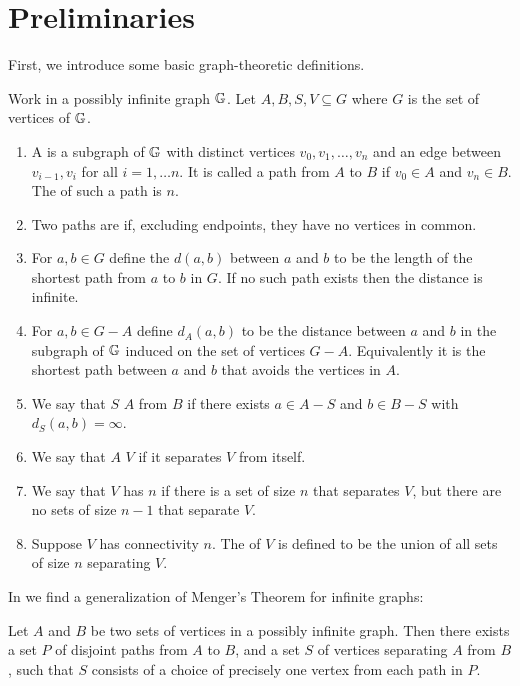 \section{Preliminaries}
First, we introduce some basic graph-theoretic definitions.
\begin{Definition}
  Work in a possibly infinite graph $\mathbb G$. Let $A, B, S, V \subseteq G$ where $G$ is the set of vertices of $\mathbb G$.
  \begin{enumerate}
  \item A  is a subgraph of $\mathbb G$ with distinct vertices $v_0, v_1, \ldots, v_n$ and an edge between $v_{i-1}, v_i$ for all $i = 1, \ldots n$.
    It is called a path from $A$ to $B$ if $v_0 \in A$ and $v_n \in B$.
    The  of such a path is $n$.
  \item Two paths are  if, excluding endpoints, they have no vertices in common.
  \item For $a,b \in G$ define the  $d(a,b)$ between $a$ and $b$ to be the length of the shortest path from $a$ to $b$ in $G$.
    If no such path exists then the distance is infinite.
  \item For $a,b \in G - A$ define $d_A(a,b)$ to be the distance between $a$ and $b$ in the subgraph of $\mathbb G$
    induced on the set of vertices $G - A$. Equivalently it is the shortest path between $a$ and $b$ that avoids the vertices in $A$.
  \item We say that $S$  $A$ from $B$ if there exists $a \in A - S$ and $b \in B - S$ with $d_S(a,b) = \infty$.
  \item We say that $A$  $V$ if it separates $V$ from itself.
  \item We say that $V$ has  $n$ if there is a set of size $n$ that separates $V$,
    but there are no sets of size $n-1$ that separate $V$.
  \item Suppose $V$ has connectivity $n$. The  of $V$ is defined to be the union of all sets of size $n$ separating $V$.
  \end{enumerate}
\end{Definition}

In \cite{infinite_megner} we find a generalization of Menger's Theorem for infinite graphs:

\begin{Theorem} \label{megner}
  Let $A$ and $B$ be two sets of vertices in a possibly infinite graph. Then there exists a set $P$ of disjoint paths from $A$ to $B$, and a set $S$ of vertices separating $A$ from $B$, such that $S$ consists of a choice of precisely one vertex from each path in $P$.
\end{Theorem}

